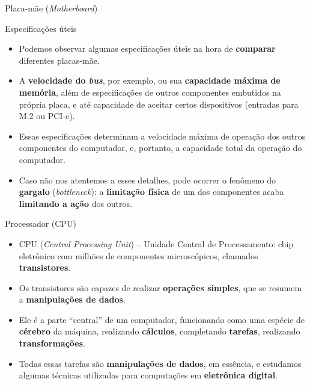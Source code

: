\begin{frame}{Placa-mãe (\textit{Motherboard})}
	\begin{block}{Especificações úteis}
		\begin{itemize}
			\item Podemos observar algumas especificações úteis na hora de \textbf{comparar} diferentes placas-mãe.
			\item A \textbf{velocidade do \textit{bus}}, por exemplo, ou sua \textbf{capacidade máxima de memória}, além de especificações de outros componentes embutidos na própria placa, e até capacidade de aceitar certos dispositivos (entradas para M.2 ou PCI-e).
			\item Essas especificações determinam a velocidade máxima de operação dos outros componentes do computador, e, portanto, a capacidade total da operação do computador.
			\item Caso não nos atentemos a esses detalhes, pode ocorrer o fenômeno do \textbf{gargalo} (\textit{bottleneck}): a \textbf{limitação física} de um dos componentes acaba \textbf{limitando a ação} dos outros.
		\end{itemize}
	\end{block}
\end{frame}


\begin{frame}{Processador (CPU)}
	\begin{block}{}
		\begin{itemize}
			\item CPU (\textit{Central Processing Unit}) – Unidade Central de Processamento: chip eletrônico com milhões de componentes microscópicos, chamados \textbf{transistores}.
			\item Os transistores são capazes de realizar \textbf{operações simples}, que se resumem a \textbf{manipulações de dados}.
			\item Ele é a parte ``central'' de um computador, funcionando como uma espécie de \textbf{cérebro} da máquina, realizando \textbf{cálculos}, completando \textbf{tarefas}, realizando \textbf{transformações}.
			\item Todas essas tarefas são \textbf{manipulações de dados}, em essência, e estudamos algumas técnicas utilizadas para computações em \textbf{eletrônica digital}.
		\end{itemize}
	\end{block}
\end{frame}


